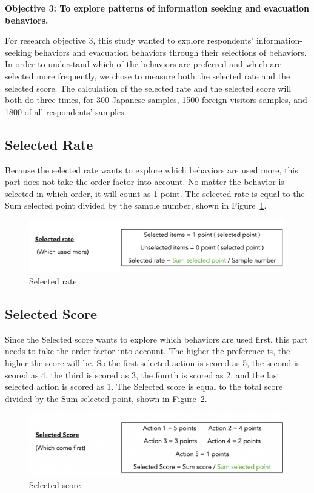 \textbf{Objective 3: To explore patterns of information seeking and evacuation behaviors.}

For research objective 3, this study wanted to explore respondents' information-seeking behaviors and evacuation behaviors through their selections of behaviors. In order to understand which of the behaviors are preferred and which are selected more frequently, we chose to measure both the selected rate and the selected score. The calculation of the selected rate and the selected score will both do three times, for 300 Japanese samples, 1500 foreign visitors samples, and 1800 of all respondents' samples.

\subsection{Selected Rate}
Because the selected rate wants to explore which behaviors are used more, this part does not take the order factor into account. No matter the behavior is selected in which order, it will count as 1 point. The selected rate is equal to the Sum selected point divided by the sample number, shown in Figure~\ref{fig10}.

\begin{figure}[h]
  \includegraphics[width=\linewidth]{Figure/Figure10.png}
  \centering
  \caption{Selected rate }
  \label{fig10}
\end{figure}

\subsection{Selected Score}

Since the Selected score wants to explore which behaviors are used first, this part needs to take the order factor into account. The higher the preference is, the higher the score will be. So the first selected action is scored as 5, the second is scored as 4, the third is scored as 3, the fourth is scored as 2, and the last selected action is scored as 1. The Selected score is equal to the total score divided by the Sum selected point, shown in Figure~\ref{fig11}.

\begin{figure}[h]
  \includegraphics[width=\linewidth]{Figure/Figure11.png}
  \centering
  \caption{Selected score}
  \label{fig11}
\end{figure}

